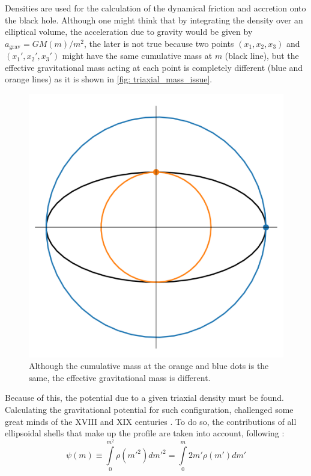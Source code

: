 		Densities are used for the calculation of the dynamical friction and accretion onto the black hole. Although one might think that by integrating the density over an elliptical volume, the acceleration due to gravity would be given by $a_\text{grav} = GM(m)/m^2$, the later is not true because two points $(x_1, x_2, x_3)$ and $(x_1', x_2', x_3')$ might have the same cumulative mass at $m$ (black line), but the effective gravitational mass acting at each point is completely different (blue and orange lines) as it is shown in \autoref{fig: triaxial_mass_issue}.
		\begin{figure}[h]
			\centering
			\includegraphics[width = 0.4\linewidth]{"../Files/Week 7/triaxial_mass_issue"}
			\caption{Although the cumulative mass at the orange and blue dots is the same, the effective gravitational mass is different.}
			\label{fig: triaxial_mass_issue}
		\end{figure}
	
		Because of this, the potential due to a given triaxial density must be found. Calculating the gravitational potential for such configuration, challenged some great minds of the XVIII and XIX centuries \cite{binney2011galactic}. To do so, the contributions of all ellipsoidal shells that make up the profile are taken into account, following \citeauthor{binney2011galactic}:
		\begin{equation}
			\psi(m) \equiv \int\limits_{0}^{m^2} \rho(m'^2)dm'^2 = \int\limits_{0}^{m} 2m'\rho(m')dm' 
		\end{equation}
		
